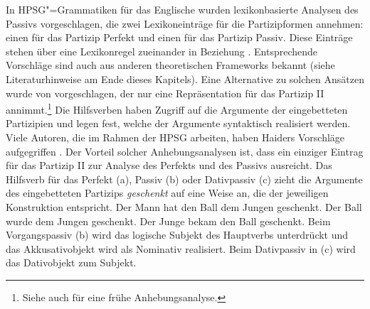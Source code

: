 In HPSG"=Grammatiken für das Englische wurden lexikonbasierte Analysen des Passivs vorgeschlagen,
die zwei Lexikoneinträge für die Partizipformen annehmen: einen für das Partizip Perfekt und einen
für das Partizip Passiv. Diese Einträge stehen über eine Lexikonregel zueinander in Beziehung
\citep[--218]{ps}. Entsprechende Vorschläge sind auch aus anderen theoretischen Frameworks
bekannt (siehe Literaturhinweise am Ende dieses Kapitels). Eine Alternative zu solchen Ansätzen
wurde von \citet{Haider86} vorgeschlagen, der nur eine Repräsentation für das Partizip II annimmt.\footnote{
        Siehe auch  für eine frühe Anhebungsanalyse.%
}
Die Hilfsverben haben Zugriff auf die Argumente der eingebetteten Partizipien und legen fest,
welche der Argumente syntaktisch realisiert werden. Viele Autoren, die im Rahmen der HPSG arbeiten,
haben Haiders Vorschläge aufgegriffen \citep{Kathol91a,Kathol94a,HM94a,Lebeth94,Pollard94a,Ryu97a,Mueller99a,Mueller2002g,Gunkel2003b}.
Der Vorteil solcher Anhebungsanalysen ist, dass ein einziger Eintrag für das Partizip II zur Analyse
des Perfekts und des Passivs ausreicht. Das Hilfsverb für das Perfekt (a), 
Passiv (b) oder Dativpassiv (c) zieht die Argumente
des eingebetteten Partizips \emph{geschenkt} auf eine Weise an, die der jeweiligen Konstruktion
entspricht.
\eal
\label{bsp-kasus-geschenkt}
\ex Der Mann  hat   den Ball   dem Jungen geschenkt.
\ex Der Ball  wurde dem Jungen            geschenkt.
\ex Der Junge bekam den Ball geschenkt.
\zl
Beim Vorgangspassiv (b) wird das logische Subjekt des Hauptverbs unterdrückt und das
Akkusativobjekt wird als Nominativ realisiert. Beim Dativpassiv in (c) wird das Dativobjekt
zum Subjekt.


